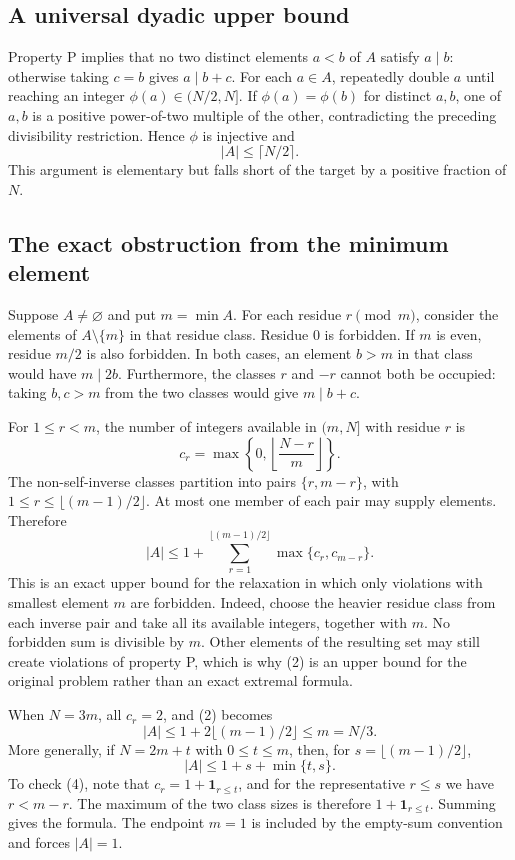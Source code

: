 \subsection{A universal dyadic upper bound}
Property P implies that no two distinct elements $a<b$ of $A$ satisfy $a\mid b$: otherwise taking $c=b$ gives $a\mid b+c$. For each $a\in A$, repeatedly double $a$ until reaching an integer $\phi(a)\in(N/2,N]$. If $\phi(a)=\phi(b)$ for distinct $a,b$, one of $a,b$ is a positive power-of-two multiple of the other, contradicting the preceding divisibility restriction. Hence $\phi$ is injective and
\[
 |A|\le\lceil N/2\rceil.
\tag{1}
\]
This argument is elementary but falls short of the target by a positive fraction of $N$.

\subsection{The exact obstruction from the minimum element}
Suppose $A\ne\varnothing$ and put $m=\min A$. For each residue $r\pmod m$, consider the elements of $A\setminus\{m\}$ in that residue class. Residue $0$ is forbidden. If $m$ is even, residue $m/2$ is also forbidden. In both cases, an element $b>m$ in that class would have $m\mid2b$. Furthermore, the classes $r$ and $-r$ cannot both be occupied: taking $b,c>m$ from the two classes would give $m\mid b+c$.

For $1\le r<m$, the number of integers available in $(m,N]$ with residue $r$ is
\[
 c_r=\max\left\{0,\left\lfloor\frac{N-r}{m}\right\rfloor\right\}.
\]
The non-self-inverse classes partition into pairs $\{r,m-r\}$, with $1\le r\le\lfloor(m-1)/2\rfloor$. At most one member of each pair may supply elements. Therefore
\[
 \boxed{\displaystyle
 |A|\le1+\sum_{r=1}^{\lfloor(m-1)/2\rfloor}
                \max\{c_r,c_{m-r}\}.}
\tag{2}
\]
This is an exact upper bound for the relaxation in which only violations with smallest element $m$ are forbidden. Indeed, choose the heavier residue class from each inverse pair and take all its available integers, together with $m$. No forbidden sum is divisible by $m$. Other elements of the resulting set may still create violations of property P, which is why (2) is an upper bound for the original problem rather than an exact extremal formula.

When $N=3m$, all $c_r=2$, and (2) becomes
\[
 |A|\le1+2\lfloor(m-1)/2\rfloor\le m=N/3.
\tag{3}
\]
More generally, if $N=2m+t$ with $0\le t\le m$, then, for $s=\lfloor(m-1)/2\rfloor$,
\[
 |A|\le1+s+\min\{t,s\}.
\tag{4}
\]
To check (4), note that $c_r=1+\mathbf1_{r\le t}$, and for the representative $r\le s$ we have $r<m-r$. The maximum of the two class sizes is therefore $1+\mathbf1_{r\le t}$. Summing gives the formula. The endpoint $m=1$ is included by the empty-sum convention and forces $|A|=1$.

